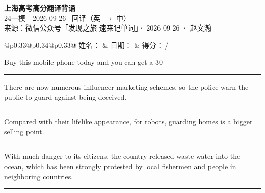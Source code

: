 \documentclass[11pt,a4paper]{article}
\newcommand{\num}[1]{\makebox[1.9em][r]{#1.}\hspace{0.3em}}
\newcommand{\wline}{\noindent\rule{\linewidth}{0.4pt}}
\begin{document}
\pagestyle{plain}
\begin{center}
{\LARGE\bfseries 上海高考高分翻译背诵 }\\[0.25em]
{\large 24一模　2026-09-26 \quad\ 回译（英 $\to$ 中）}\\[0.35em]
{\footnotesize 来源：微信公众号「发现之旅 速来记单词」· 2026-09-26 · 赵文瀚}
\end{center}

\vspace{0.4em}
\noindent\begin{tabular}{@{}p{0.33\textwidth}@{}p{0.34\textwidth}@{}p{0.33\textwidth}@{}}
姓名：\underline{\hspace{2.0cm}} & 日期：\underline{\hspace{2.0cm}} & 得分：\underline{\hspace{1.4cm}}\,/ \\
\end{tabular}

\vspace{0.5em}

\vspace{0.8em}
\num{1}Buy this mobile phone today and you can get a 30%

\vspace{0.25em}

\wline

\num{2}There are now numerous influencer marketing schemes, so the police warn the public to guard against being deceived.

\vspace{0.25em}

\wline

\num{3}Compared with their lifelike appearance, for robots, guarding homes is a bigger selling point.

\vspace{0.25em}

\wline

\num{4}With much danger to its citizens, the country released waste water into the ocean, which has been strongly protested by local fishermen and people in neighboring countries.

\vspace{0.25em}

\wline
\end{document}
